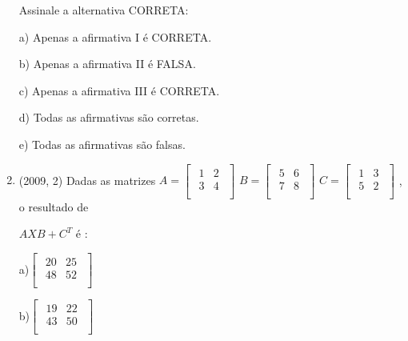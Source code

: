 \documentclass{article}
\begin{document}
\begin{enumerate}
Assinale a alternativa CORRETA:

a) Apenas a afirmativa I é CORRETA.

b) Apenas a afirmativa II é FALSA.

c) Apenas a afirmativa III é CORRETA.

d) Todas as afirmativas são corretas.

e) Todas as afirmativas são falsas.\newline








\item(2009, 2) Dadas as matrizes 
$
A = \left [ \begin{matrix} 
    \begin{array}{cccc}
    1 & 2  \\
    3 & 4  \\
\end{array}
\end{matrix} \right ]$
$
B = \left [ \begin{matrix} 
    \begin{array}{cccc}
    5 & 6  \\
    7 & 8  \\
\end{array}
\end{matrix} \right ]$
$
C = \left [ \begin{matrix} 
    \begin{array}{cccc}
    1 & 3  \\
    5 & 2  \\
\end{array}
\end{matrix} \right ]$ , o resultado de

$A X B + C^T$ é :


a)$\left [ \begin{matrix} 
    \begin{array}{cccc}
    20 & 25  \\
    48 & 52  \\
\end{array}
\end{matrix} \right ]$

b)$\left [ \begin{matrix} 
    \begin{array}{cccc}
    19 & 22  \\
    43 & 50  \\
\end{array}
\end{matrix} \right ]$


\end{enumerate}
\end{document}
